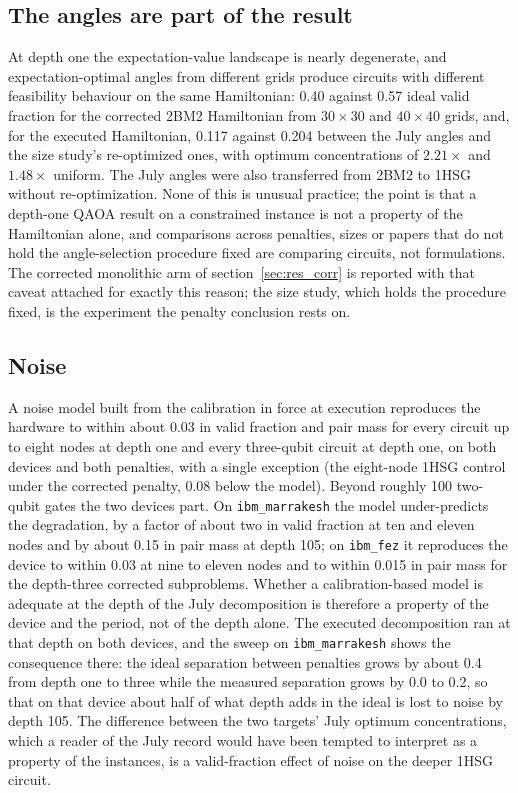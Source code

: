 \documentclass{iopjournal}
\begin{document}
\subsection{The angles are part of the result}
\label{sec:disc_params}
At depth one the expectation-value landscape is nearly degenerate, and expectation-optimal angles from different grids produce circuits with different feasibility behaviour on the same Hamiltonian: 0.40 against 0.57 ideal valid fraction for the corrected 2BM2 Hamiltonian from $30\times30$ and $40\times40$ grids, and, for the executed Hamiltonian, 0.117 against 0.204 between the July angles and the size study's re-optimized ones, with optimum concentrations of $2.21\times$ and $1.48\times$ uniform. The July angles were also transferred from 2BM2 to 1HSG without re-optimization. None of this is unusual practice; the point is that a depth-one QAOA result on a constrained instance is not a property of the Hamiltonian alone, and comparisons across penalties, sizes or papers that do not hold the angle-selection procedure fixed are comparing circuits, not formulations. The corrected monolithic arm of section~\ref{sec:res_corr} is reported with that caveat attached for exactly this reason; the size study, which holds the procedure fixed, is the experiment the penalty conclusion rests on.

\subsection{Noise}
\label{sec:disc_noise}
A noise model built from the calibration in force at execution reproduces the hardware to within about 0.03 in valid fraction and pair mass for every circuit up to eight nodes at depth one and every three-qubit circuit at depth one, on both devices and both penalties, with a single exception (the eight-node 1HSG control under the corrected penalty, 0.08 below the model). Beyond roughly 100 two-qubit gates the two devices part. On \texttt{ibm\_marrakesh} the model under-predicts the degradation, by a factor of about two in valid fraction at ten and eleven nodes and by about 0.15 in pair mass at depth 105; on \texttt{ibm\_fez} it reproduces the device to within 0.03 at nine to eleven nodes and to within 0.015 in pair mass for the depth-three corrected subproblems. Whether a calibration-based model is adequate at the depth of the July decomposition is therefore a property of the device and the period, not of the depth alone. The executed decomposition ran at that depth on both devices, and the sweep on \texttt{ibm\_marrakesh} shows the consequence there: the ideal separation between penalties grows by about 0.4 from depth one to three while the measured separation grows by 0.0 to 0.2, so that on that device about half of what depth adds in the ideal is lost to noise by depth 105. The difference between the two targets' July optimum concentrations, which a reader of the July record would have been tempted to interpret as a property of the instances, is a valid-fraction effect of noise on the deeper 1HSG circuit.
\end{document}
